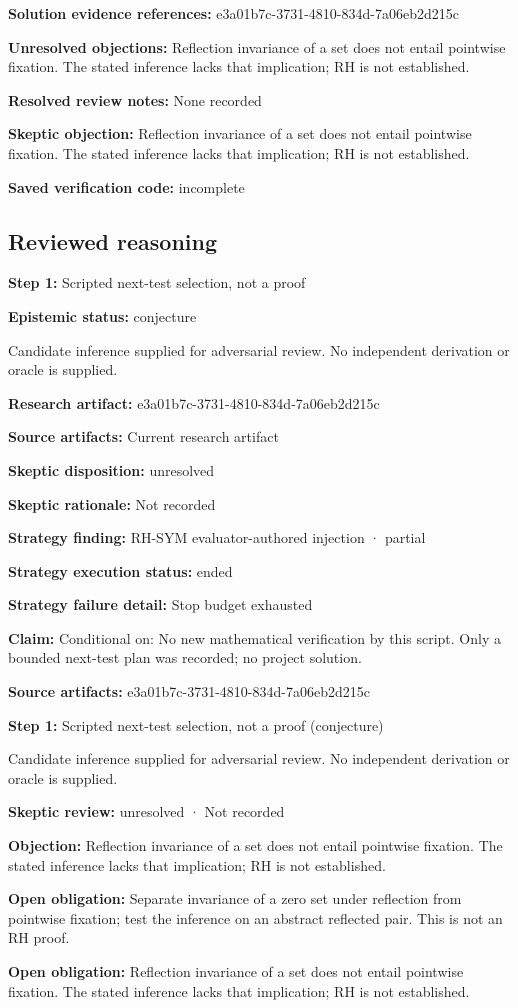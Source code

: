 \documentclass[11pt]{article}
\begin{document}
\textbf{Solution evidence references:} e3a01b7c-3731-4810-834d-7a06eb2d215c\par
\textbf{Unresolved objections:} Reflection invariance of a set does not entail pointwise fixation. The stated inference lacks that implication; RH is not established.\par
\textbf{Resolved review notes:} None recorded\par
\textbf{Skeptic objection:} Reflection invariance of a set does not entail pointwise fixation. The stated inference lacks that implication; RH is not established.\par
\textbf{Saved verification code:} incomplete\par
\subsection{Reviewed reasoning}
\textbf{Step 1:} Scripted next-test selection, not a proof\par
\textbf{Epistemic status:} conjecture\par
Candidate inference supplied for adversarial review. No independent derivation or oracle is supplied.\par
\textbf{Research artifact:} e3a01b7c-3731-4810-834d-7a06eb2d215c\par
\textbf{Source artifacts:} Current research artifact\par
\textbf{Skeptic disposition:} unresolved\par
\textbf{Skeptic rationale:} Not recorded\par
\textbf{Strategy finding:} RH-SYM evaluator-authored injection · partial\par
\textbf{Strategy execution status:} ended\par
\textbf{Strategy failure detail:} Stop budget exhausted\par
\textbf{Claim:} Conditional on: No new mathematical verification by this script. Only a bounded next-test plan was recorded; no project solution.\par
\textbf{Source artifacts:} e3a01b7c-3731-4810-834d-7a06eb2d215c\par
\textbf{Step 1:} Scripted next-test selection, not a proof (conjecture)\par
Candidate inference supplied for adversarial review. No independent derivation or oracle is supplied.\par
\textbf{Skeptic review:} unresolved · Not recorded\par
\textbf{Objection:} Reflection invariance of a set does not entail pointwise fixation. The stated inference lacks that implication; RH is not established.\par
\textbf{Open obligation:} Separate invariance of a zero set under reflection from pointwise fixation; test the inference on an abstract reflected pair. This is not an RH proof.\par
\textbf{Open obligation:} Reflection invariance of a set does not entail pointwise fixation. The stated inference lacks that implication; RH is not established.\par
\end{document}
